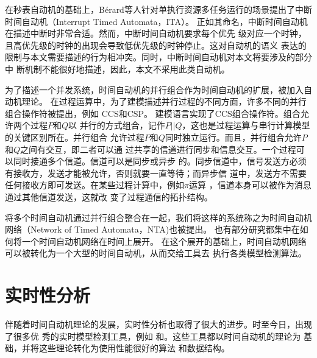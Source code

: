 在秒表自动机的基础上，B{\'e}rard等人针对单执行资源多任务运行的场景提出了中断
时间自动机（Interrupt Timed Automata，ITA）。\cite{Berard:2012:ITA:2158996.2159045}
正如其命名，中断时间自动机在描述中断时非常合适。然而，中断时间自动机要求每个优先
级对应一个时钟，且高优先级的时钟的出现会导致低优先级的时钟停止。这对自动机的语义
表达的限制与本文需要描述的行为相冲突。同时，中断时间自动机对本文将要涉及的部分中
断机制不能很好地描述，因此，本文不采用此类自动机。

为了描述一个并发系统，时间自动机的并行组合作为时间自动机的扩展，被加入自动机理论。
在过程运算中，为了建模描述并行过程的不同方面，许多不同的并行组合操作符被提出，例如
CCS\cite{Milner:1989:CC:534666}和CSP\cite{Hoare:1978:CSP:359576.359585}。\uppaal 
建模语言\cite{Larsen97uppaalin}实现了CCS组合操作符。组合允许两个过程$P$和$Q$以
并行的方式组合，记作$P||Q$，这也是过程运算与串行计算模型的关键区别所在。并行组合
允许过程$P$和$Q$同时独立运行。而且，并行组合允许$P$和$Q$之间有交互，即二者可以通
过共享的信道进行同步和信息交互。一个过程可以同时接通多个信道。信道可以是同步或异步
的。同步信道中，信号发送方必须有接收方，发送才能被允许，否则就要一直等待；而异步信
道中，发送方不需要任何接收方即可发送。在某些过程计算中，例如$\pi$运算
\cite{Sangiorgi:2001:PTM:559050}，信道本身可以被作为消息通过其他信道发送，这就改
变了过程通信的拓扑结构。

将多个时间自动机通过并行组合整合在一起，我们将这样的系统称之为时间自动机网络（Network 
of Timed Automata，NTA)也被提出。\cite{Alur:1994:TTA:180782.180519,Bouyer06timedunfoldings}
也有部分研究都集中在如何将一个时间自动机网络在时间上展开。\cite{Bouyer06timedunfoldings}
在这个展开的基础上，时间自动机网络可以被转化为一个大型的时间自动机，从而交给工具去
执行各类模型检测算法。\cite{Bengtsson04timedautomata:}

\section{实时性分析}
\label{sec:timing_study}

伴随着时间自动机理论的发展，实时性分析也取得了很大的进步。时至今日，出现了很多优
秀的实时模型检测工具，例如\uppaal \cite{Behrmann04atutorial, Larsen97efficientverification}
和\cite{Yovine97kronos:a}。这些工具都以时间自动机的理论为
基础，并将这些理论转化为使用性能很好的算法
\cite{Behrmann:2002:UIS:646847.707113, Behrmann:2006:LUB:1165374.1165376, BehrmannHV00, Behrmann:to}
和数据结构\cite{Behrmann98efficienttimed, Larsen97efficientverification, Larsen:1999:CDD:774455.774459}。

